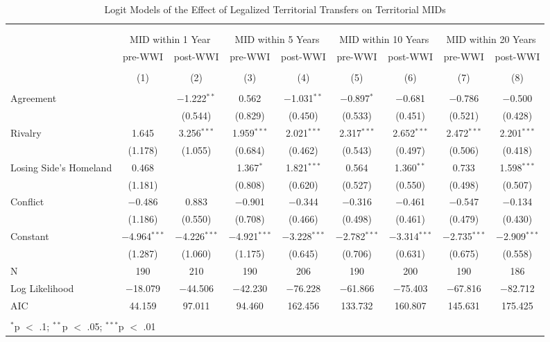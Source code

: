 \documentclass{article}
\begin{document}
\begin{table}[!htbp] \centering 
  \caption{Logit Models of the Effect of Legalized Territorial Transfers on Territorial MIDs} 
  \label{} 
\begin{tabular}{@{\extracolsep{5pt}}lcccccccc} 
\\[-1.8ex]\hline \\[-1.8ex] 
\\[-1.8ex] & \multicolumn{2}{c}{MID within 1 Year} & \multicolumn{2}{c}{MID within 5 Years} & \multicolumn{2}{c}{MID within 10 Years} & \multicolumn{2}{c}{MID within 20 Years} \\ 
 & pre-WWI & post-WWI & pre-WWI & post-WWI & pre-WWI & post-WWI & pre-WWI & post-WWI \\ 
\\[-1.8ex] & (1) & (2) & (3) & (4) & (5) & (6) & (7) & (8)\\ 
\hline \\[-1.8ex] 
 Agreement &  & $-$1.222$^{**}$ & 0.562 & $-$1.031$^{**}$ & $-$0.897$^{*}$ & $-$0.681 & $-$0.786 & $-$0.500 \\ 
  &  & (0.544) & (0.829) & (0.450) & (0.533) & (0.451) & (0.521) & (0.428) \\ 
  Rivalry & 1.645 & 3.256$^{***}$ & 1.959$^{***}$ & 2.021$^{***}$ & 2.317$^{***}$ & 2.652$^{***}$ & 2.472$^{***}$ & 2.201$^{***}$ \\ 
  & (1.178) & (1.055) & (0.684) & (0.462) & (0.543) & (0.497) & (0.506) & (0.418) \\ 
  Losing Side's Homeland & 0.468 &  & 1.367$^{*}$ & 1.821$^{***}$ & 0.564 & 1.360$^{**}$ & 0.733 & 1.598$^{***}$ \\ 
  & (1.181) &  & (0.808) & (0.620) & (0.527) & (0.550) & (0.498) & (0.507) \\ 
  Conflict & $-$0.486 & 0.883 & $-$0.901 & $-$0.344 & $-$0.316 & $-$0.461 & $-$0.547 & $-$0.134 \\ 
  & (1.186) & (0.550) & (0.708) & (0.466) & (0.498) & (0.461) & (0.479) & (0.430) \\ 
  Constant & $-$4.964$^{***}$ & $-$4.226$^{***}$ & $-$4.921$^{***}$ & $-$3.228$^{***}$ & $-$2.782$^{***}$ & $-$3.314$^{***}$ & $-$2.735$^{***}$ & $-$2.909$^{***}$ \\ 
  & (1.287) & (1.060) & (1.175) & (0.645) & (0.706) & (0.631) & (0.675) & (0.558) \\ 
 N & 190 & 210 & 190 & 206 & 190 & 200 & 190 & 186 \\ 
Log Likelihood & $-$18.079 & $-$44.506 & $-$42.230 & $-$76.228 & $-$61.866 & $-$75.403 & $-$67.816 & $-$82.712 \\ 
AIC & 44.159 & 97.011 & 94.460 & 162.456 & 133.732 & 160.807 & 145.631 & 175.425 \\ 
\hline \\[-1.8ex] 
\multicolumn{9}{l}{$^{*}$p $<$ .1; $^{**}$p $<$ .05; $^{***}$p $<$ .01} \\ 
\end{tabular} 
\end{table}
\end{document}
